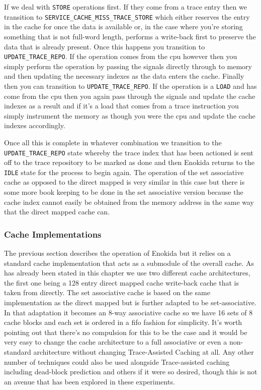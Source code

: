 If we deal with \texttt{STORE} operations first. If they come from a trace entry then we transition to \texttt{SERVICE\_CACHE\_MISS\_TRACE\_STORE} which either reserves the entry in the cache for once the data is available or, in the case where you're storing something that is not full-word length, performs a write-back first to preserve the data that is already present. Once this happens you transition to \texttt{UPDATE\_TRACE\_REPO}. If the operation comes from the \gls{cpu} however then you simply perform the operation by passing the signals directly through to memory and then updating the necessary indexes as the data enters the cache. Finally then you can transition to \texttt{UPDATE\_TRACE\_REPO}. If the operation is a \texttt{LOAD} and has come from the \gls{cpu} then you again pass through the signals and update the cache indexes as a result and if it's a load that comes from a trace instruction you simply instrument the memory as though you were the \gls{cpu} and update the cache indexes accordingly.

Once all this is complete in whatever combination we transition to the \texttt{UPDATE\_TRACE\_REPO} state whereby the trace index that has been actioned is sent off to the trace repository to be marked as done and then Enokida returns to the \texttt{IDLE} state for the process to begin again. The operation of the set associative cache as opposed to the direct mapped is very similar in this case but there is some more book keeping to be done in the set associative version because the cache index cannot easily be obtained from the memory address in the same way that the direct mapped cache can.

\subsubsection{Cache Implementations}

The previous section describes the operation of Enokida but it relies on a standard cache implementation that acts as a submodule of the overall cache. As has already been stated in this chapter we use two different cache architectures, the first one being a 128 entry direct mapped cache write-back cache that is taken from \citet{hennessyComputerArchitectureQuantitative2019} directly. The set associative cache is based on the same implementation as the direct mapped but is further adapted to be set-associative. In that adaptation it becomes an 8-way associative cache so we have 16 sets of 8 cache blocks and each set is ordered in a \gls{fifo} fashion for simplicity. It's worth pointing out that there's no compulsion for this to be the case and it would be very easy to change the cache architecture to a full associative or even a non-standard architecture without changing Trace-Assisted Caching at all. Any other number of techniques could also be used alongside Trace-assisted caching including dead-block prediction and others if it were so desired, though this is not an avenue that has been explored in these experiments. 

